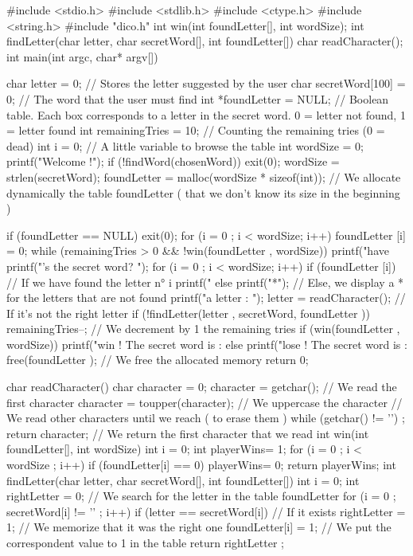 \begin{Csource}
  #include <stdio.h>
  #include <stdlib.h>
  #include <ctype.h>
  #include <string.h>
  #include "dico.h"
  int win(int foundLetter[], int wordSize);
  int findLetter(char letter, char secretWord[], int foundLetter[])
  char readCharacter();
  int main(int argc, char* argv[])
  {
  	char letter = 0; // Stores the letter suggested by the user
  	char secretWord[100] = {0}; // The word that the user must find
  	int *foundLetter = NULL; // Boolean table. Each box corresponds to a letter in the secret word. 0 = letter not found, 1 = letter found
  	int remainingTries = 10; // Counting the remaining tries  (0 = dead)
  	int i = 0; // A little variable to browse the table
  	int wordSize = 0;
  	printf("Welcome !\n\n");
  	if (!findWord(chosenWord))
  	 	exit(0);
  	wordSize = strlen(secretWord);
  	foundLetter = malloc(wordSize  * sizeof(int)); // We allocate dynamically the table foundLetter ( that we don’t know its size in the beginning )

  	if (foundLetter  == NULL)
  		 exit(0);
  	for (i = 0 ; i < wordSize; i++)
      		 foundLetter [i] = 0;
  	while (remainingTries > 0 && !win(foundLetter , wordSize))
  	{
      		printf("\n\nYou have %
      		printf("\nWhat’s the secret word? ");
      		for (i = 0 ; i < wordSize; i++)
      		{
          			if (foundLetter [i]) // If we have found the letter n° i
  		      		printf("%
  		        	else
  		            	printf("*"); // Else, we display a * for the letters that are not found
      		}
      		 printf("\nSuggest a letter : ");
  	    	letter = readCharacter();
  	    	// If it’s not the right letter
  	    	if (!findLetter(letter , secretWord, foundLetter ))
  	    	{
  		        	 remainingTries--; // We decrement by 1 the remaining tries
      		}
  	}
  	if (win(foundLetter , wordSize))
  	    	printf("\n\nYou win ! The secret word is : %
  	else
  	    	printf("\n\nTou lose ! The secret word is : %
  	free(foundLetter ); // We free the allocated memory
      	return 0;
  }
  char readCharacter()
  {
  	char character = 0;
  	 character = getchar(); // We read the first character
  	character = toupper(character); // We uppercase the character
  	// We read other characters until we reach  \n ( to erase them )
  	while (getchar() != '\n') ;
  	return character; // We return the first character that we read
  }
  int win(int foundLetter[], int wordSize)
  {
  	int i = 0;
  	int playerWins= 1;
  	for (i = 0 ; i < wordSize ; i++)
  	{
      		if (foundLetter[i] == 0)
          			playerWins= 0;
  	}
  	return playerWins;
  }
  int findLetter(char letter, char secretWord[], int foundLetter[])
  {
  	int i = 0;
  	int rightLetter = 0;
  	// We search for the letter in the table foundLetter
  	for (i = 0 ; secretWord[i] != '\0' ; i++)
  	{
      		if (letter == secretWord[i]) // If it exists
      		{
          			rightLetter = 1; // We memorize that it was the right one
          			 foundLetter[i] = 1; // We put the correspondent value to 1 in the table
      		}
  	}
  	return rightLetter ;
  }
\end{Csource}

